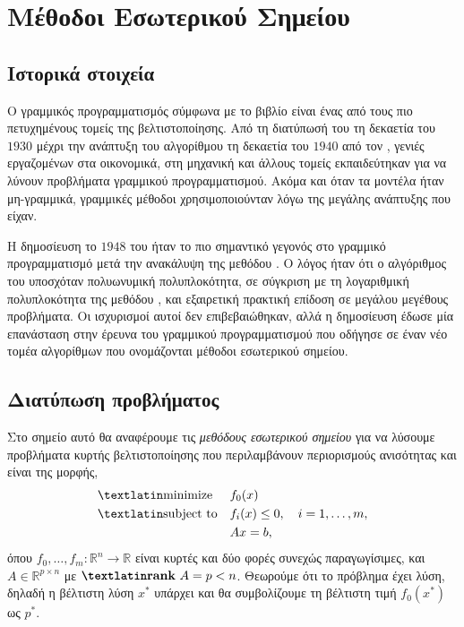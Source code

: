 \chapter{Μέθοδοι Εσωτερικού Σημείου}\label{ch:ip}
\section{Ιστορικά στοιχεία}
Ο γραμμικός προγραμματισμός σύμφωνα με το βιβλίο \cite{wright1997primal}
είναι ένας από τους πιο πετυχημένους τομείς της
βελτιστοποίησης. Από τη διατύπωσή του τη δεκαετία του \(1930\) μέχρι την
ανάπτυξη του αλγορίθμου  τη δεκαετία του \(1940\) από τον
, γενιές εργαζομένων στα οικονομικά, στη μηχανική και άλλους τομείς
εκπαιδεύτηκαν για να λύνουν προβλήματα γραμμικού προγραμματισμού. Ακόμα και όταν
τα μοντέλα ήταν μη-γραμμικά, γραμμικές μέθοδοι χρησιμοποιούνταν λόγω της μεγάλης
ανάπτυξης που είχαν.

Η δημοσίευση το \(1948\) του  \cite{karmarkar1984} ήταν το πιο σημαντικό γεγονός στο
γραμμικό προγραμματισμό μετά την ανακάλυψη της μεθόδου . Ο λόγος
ήταν ότι ο αλγόριθμος του  υποσχόταν πολυωνυμική πολυπλοκότητα, σε
σύγκριση με τη λογαριθμική πολυπλοκότητα της μεθόδου , και
εξαιρετική πρακτική επίδοση σε μεγάλου μεγέθους προβλήματα. Οι ισχυρισμοί αυτοί
δεν επιβεβαιώθηκαν, αλλά η δημοσίευση έδωσε μία επανάσταση στην έρευνα του
γραμμικού προγραμματισμού που οδήγησε σε έναν νέο τομέα αλγορίθμων που
ονομάζονται μέθοδοι εσωτερικού σημείου.

\section{Διατύπωση προβλήματος}
Στο σημείο αυτό θα αναφέρουμε τις \emph{μεθόδους εσωτερικού σημείου} για να
λύσουμε προβλήματα κυρτής βελτιστοποίησης που περιλαμβάνουν περιορισμούς
ανισότητας και είναι της μορφής,
\begin{equation}\label{eq:ip_min}
    \begin{aligned}
        & \text{\tl{minimize}}
        & & f_0(x) \\
        & \text{\tl{subject to}}
        & & f_i(x) \leq 0, \quad i = 1,\dots,m, \\
        &&& Ax = b,
    \end{aligned}
\end{equation}
όπου \( f_0, \dots, f_m : \mathbb{R}^n \to \mathbb{R} \) είναι κυρτές και δύο
φορές συνεχώς παραγωγίσιμες, και \( A \in \mathbb{R}^{p \times n} \) με
\( \textbf{\tl{rank}} \ A = p < n \). Θεωρούμε ότι το πρόβλημα έχει λύση, δηλαδή
η βέλτιστη λύση \( x^* \) υπάρχει και θα συμβολίζουμε τη βέλτιστη τιμή \(
f_0(x^*) \) ως \( p^* \).

